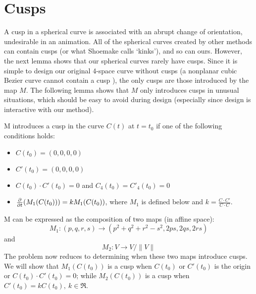 \section{Cusps}
\label{sec:cusps}


A cusp in a spherical curve is associated with an abrupt change
of orientation, undesirable in an animation.
All of the spherical curves created by other methods can contain cusps
(or what Shoemake calls `kinks'), and so can ours.
However, the next lemma shows that our spherical curves rarely have cusps.
Since it is simple to design our original 4-space curve without cusps
(a nonplanar cubic Bezier curve cannot contain a cusp \cite{farin93}),
the only cusps are those introduced by the map $M$.
The following lemma shows that $M$ only introduces cusps in unusual
situations, which should be easy to avoid during design
(especially since design is interactive with our method).

\begin{lemma}
M introduces a cusp in the curve $C(t)$ at $t=t_0$
if one of the following conditions holds:
\begin{itemize}
\item
	$C(t_0) = (0,0,0,0)$
\item
	$C'(t_0) = (0,0,0,0)$
\item
	$C(t_0) \cdot C'(t_0) = 0$ and $C_4(t_0) = C'_4(t_0) = 0$
\item
	$\frac{\partial}{\partial t}(M_1(C(t_0))) = kM_1(C(t_0))$, where $M_1$ is defined below
	and $k = \frac{C \cdot C'}{C \cdot C}$.
\end{itemize}
\end{lemma}
\prf
M can be expressed as the composition of two maps (in affine space):
\[
M_1: (p,q,r,s) \rightarrow (p^2 + q^2 + r^2 -s^2 , 2ps,2qs,2rs)
\]
and
\[
M_2: V \rightarrow V/\|V\|
\]
The problem now reduces to determining when these two maps introduce cusps.
We will show that $M_1(C(t_0))$ is a cusp when
$C(t_0)$ or $C'(t_0)$ is the origin or $C(t_0) \cdot C'(t_0) = 0$;
while $M_2(C(t_0))$ is a cusp when $C'(t_0) = kC(t_0),\ k \in \Re$.

